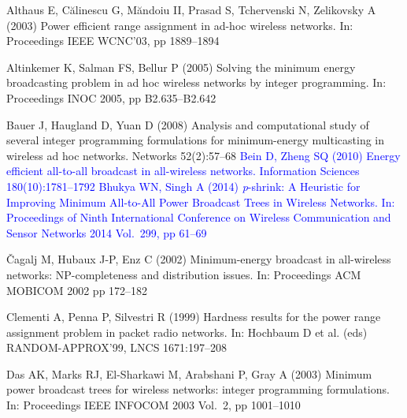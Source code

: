 \documentclass[natbib,smallextended]{svjour3}       %
\begin{document}
\begin{thebibliography}{}

%
%

Althaus E, C\u{a}linescu G, M\u{a}ndoiu II, Prasad S, Tchervenski N, Zelikovsky A (2003)
Power efficient range assignment in ad-hoc wireless networks.
In: Proceedings IEEE WCNC’03, pp 1889--1894

Altinkemer K, Salman FS, Bellur P (2005)
Solving the minimum energy broadcasting problem in ad hoc wireless networks by integer programming.
In: Proceedings INOC 2005, pp B2.635--B2.642

Bauer J, Haugland D, Yuan D (2008)
Analysis and computational study of several integer programming formulations for minimum-energy multicasting in wireless ad hoc networks.
Networks 52(2):57–68
\textcolor{blue}{
Bein D, Zheng SQ (2010)
Energy efficient all-to-all broadcast in all-wireless networks.
Information Sciences 180(10):1781--1792}
\textcolor{blue}{
Bhukya WN, Singh A (2014)
\emph{p}-shrink: A Heuristic for Improving Minimum All-to-All Power Broadcast Trees in Wireless Networks.
In: Proceedings of Ninth International Conference on Wireless Communication and Sensor Networks 2014 
Vol.\ 299, pp 61--69}

\v{C}agalj M, Hubaux J-P, Enz C (2002)
Minimum-energy broadcast in all-wireless networks: NP-completeness and distribution issues.
In: Proceedings ACM MOBICOM 2002 pp 172--182

Clementi A, Penna P, Silvestri R (1999)
Hardness results for the power range assignment problem in packet radio networks.
In: Hochbaum D et al. (eds) RANDOM-APPROX’99,
LNCS 1671:197--208

Das AK, Marks RJ, El-Sharkawi M, Arabshani P, Gray A (2003)
Minimum power broadcast trees for wireless networks: integer programming formulations.
In: Proceedings IEEE INFOCOM 2003 Vol.\ 2, pp 1001--1010


\end{thebibliography}
\end{document}
